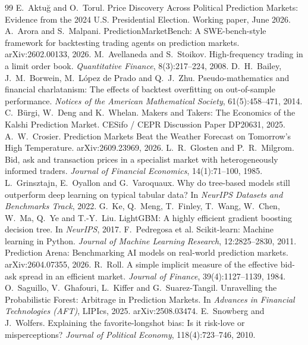 \documentclass[11pt,a4paper]{article}
\begin{document}
{\raggedright
\begin{thebibliography}{99}
 E.~Aktu\u{g} and O.~Torul. Price Discovery Across Political Prediction Markets: Evidence from the 2024 U.S. Presidential Election. Working paper, June 2026.
 A.~Arora and S.~Malpani. PredictionMarketBench: A SWE-bench-style framework for backtesting trading agents on prediction markets. arXiv:2602.00133, 2026.
 M.~Avellaneda and S.~Stoikov. High-frequency trading in a limit order book. \emph{Quantitative Finance}, 8(3):217--224, 2008.
 D.~H.~Bailey, J.~M.~Borwein, M.~L\'opez de Prado and Q.~J.~Zhu. Pseudo-mathematics and financial charlatanism: The effects of backtest overfitting on out-of-sample performance. \emph{Notices of the American Mathematical Society}, 61(5):458--471, 2014.
 C.~B\"urgi, W.~Deng and K.~Whelan. Makers and Takers: The Economics of the Kalshi Prediction Market. CESifo / CEPR Discussion Paper DP20631, 2025.
 A.~W.~Crosier. Prediction Markets Beat the Weather Forecast on Tomorrow's High Temperature. arXiv:2609.23969, 2026.
 L.~R.~Glosten and P.~R.~Milgrom. Bid, ask and transaction prices in a specialist market with heterogeneously informed traders. \emph{Journal of Financial Economics}, 14(1):71--100, 1985.
 L.~Grinsztajn, E.~Oyallon and G.~Varoquaux. Why do tree-based models still outperform deep learning on typical tabular data? In \emph{NeurIPS Datasets and Benchmarks Track}, 2022.
 G.~Ke, Q.~Meng, T.~Finley, T.~Wang, W.~Chen, W.~Ma, Q.~Ye and T.-Y.~Liu. LightGBM: A highly efficient gradient boosting decision tree. In \emph{NeurIPS}, 2017.
 F.~Pedregosa et al. Scikit-learn: Machine learning in Python. \emph{Journal of Machine Learning Research}, 12:2825--2830, 2011.
 Prediction Arena: Benchmarking AI models on real-world prediction markets. arXiv:2604.07355, 2026.
 R.~Roll. A simple implicit measure of the effective bid-ask spread in an efficient market. \emph{Journal of Finance}, 39(4):1127--1139, 1984.
 O.~Saguillo, V.~Ghafouri, L.~Kiffer and G.~Suarez-Tangil. Unravelling the Probabilistic Forest: Arbitrage in Prediction Markets. In \emph{Advances in Financial Technologies (AFT)}, LIPIcs, 2025. arXiv:2508.03474.
 E.~Snowberg and J.~Wolfers. Explaining the favorite-longshot bias: Is it risk-love or misperceptions? \emph{Journal of Political Economy}, 118(4):723--746, 2010.

\end{thebibliography}}
\end{document}
